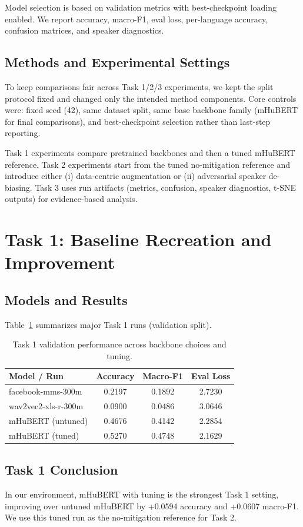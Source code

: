 \documentclass[11pt]{article}
\begin{document}
Model selection is based on validation metrics with best-checkpoint loading enabled. We report accuracy, macro-F1, eval loss, per-language accuracy, confusion matrices, and speaker diagnostics.

\subsection{Methods and Experimental Settings}
To keep comparisons fair across Task 1/2/3 experiments, we kept the split protocol fixed and changed only the intended method components. Core controls were: fixed seed (42), same dataset split, same base backbone family (mHuBERT for final comparisons), and best-checkpoint selection rather than last-step reporting.

Task 1 experiments compare pretrained backbones and then a tuned mHuBERT reference. Task 2 experiments start from the tuned no-mitigation reference and introduce either (i) data-centric augmentation or (ii) adversarial speaker de-biasing. Task 3 uses run artifacts (metrics, confusion, speaker diagnostics, t-SNE outputs) for evidence-based analysis.

\section{Task 1: Baseline Recreation and Improvement}
\subsection{Models and Results}
Table~\ref{tab:task1-models} summarizes major Task 1 runs (validation split).

\begin{table}[t]
\centering
\small
\begin{tabular}{lccc}
\toprule
Model / Run & Accuracy & Macro-F1 & Eval Loss \\
\midrule
facebook-mms-300m & 0.2197 & 0.1892 & 2.7230 \\
wav2vec2-xls-r-300m & 0.0900 & 0.0486 & 3.0646 \\
mHuBERT (untuned) & 0.4676 & 0.4142 & 2.2854 \\
mHuBERT (tuned) & 0.5270 & 0.4748 & 2.1629 \\
\bottomrule
\end{tabular}
\caption{Task 1 validation performance across backbone choices and tuning.}
\label{tab:task1-models}
\end{table}

\subsection{Task 1 Conclusion}
In our environment, mHuBERT with tuning is the strongest Task 1 setting, improving over untuned mHuBERT by +0.0594 accuracy and +0.0607 macro-F1. We use this tuned run as the no-mitigation reference for Task 2.
\end{document}
